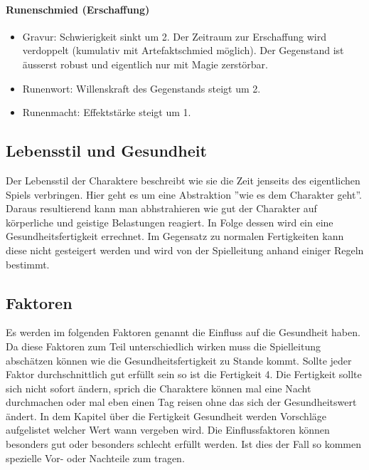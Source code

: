 \documentclass{article}
\begin{document}
\paragraph{Runenschmied (Erschaffung)}

\begin{itemize}
\item Gravur: Schwierigkeit sinkt um 2. Der Zeitraum zur Erschaffung wird verdoppelt (kumulativ mit Artefaktschmied möglich). Der Gegenstand ist äusserst robust und eigentlich nur mit Magie zerstörbar.
\item Runenwort: Willenskraft des Gegenstands steigt um 2.
\item Runenmacht: Effektstärke steigt um 1.
\end{itemize}

\begin{center}
\section{Lebensstil und Gesundheit}
\end{center}

Der Lebensstil der Charaktere beschreibt wie sie die Zeit jenseits des eigentlichen Spiels verbringen. Hier geht es
um eine Abstraktion ''wie es dem Charakter geht''. Daraus resultierend kann man abhstrahieren wie gut der Charakter auf
körperliche und geistige Belastungen reagiert. In Folge dessen wird ein eine Gesundheitsfertigkeit errechnet. Im
Gegensatz zu normalen Fertigkeiten kann diese nicht gesteigert werden und wird von der Spielleitung anhand einiger
Regeln bestimmt.

\begin{center}
\subsection{Faktoren}
\end{center}

Es werden im folgenden Faktoren genannt die Einfluss auf die Gesundheit haben. Da diese Faktoren zum Teil
unterschiedlich wirken muss die Spielleitung abschätzen können wie die Gesundheitsfertigkeit zu Stande kommt. Sollte
jeder Faktor durchschnittlich gut erfüllt sein so ist die Fertigkeit 4. Die Fertigkeit sollte sich nicht sofort ändern,
sprich die Charaktere können mal eine Nacht durchmachen oder mal eben einen Tag reisen ohne das sich der Gesundheitswert
ändert. In dem Kapitel über die Fertigkeit Gesundheit werden Vorschläge aufgelistet welcher Wert wann vergeben wird.
Die Einflussfaktoren können besonders gut oder besonders schlecht erfüllt werden. Ist dies der Fall so kommen spezielle
Vor- oder Nachteile zum tragen.
\end{document}
